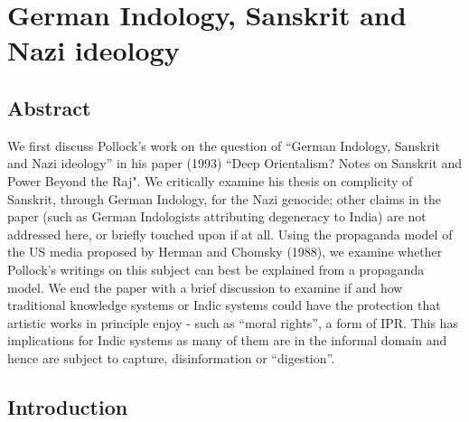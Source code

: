\chapter{German Indology, Sanskrit and Nazi ideology}\label{chapter1}
\vskip -10pt

\vskip -10pt

\section*{Abstract}

We first discuss Pollock’s work on the question of “German Indology, Sanskrit and Nazi ideology” in his paper (1993) ``Deep Orientalism? Notes on Sanskrit and Power Beyond the Raj". We critically examine his thesis on complicity of Sanskrit, through German Indology, for the Nazi genocide; other claims in the paper (such as German Indologists attributing degeneracy to India) are not addressed here, or briefly touched upon if at all. Using the propaganda model of the US media proposed by Herman and Chomsky (1988), we examine whether Pollock’s writings on this subject can best be explained from a propaganda model.  We end the paper with a brief discussion to examine if and how traditional knowledge systems or Indic systems could have the protection that artistic works in principle enjoy - such as ``moral rights”, a form of IPR\@. This has implications for Indic systems as many of them are in the informal domain and hence are subject to capture, disinformation or “digestion”.

\vskip -10pt


\section*{Introduction}

